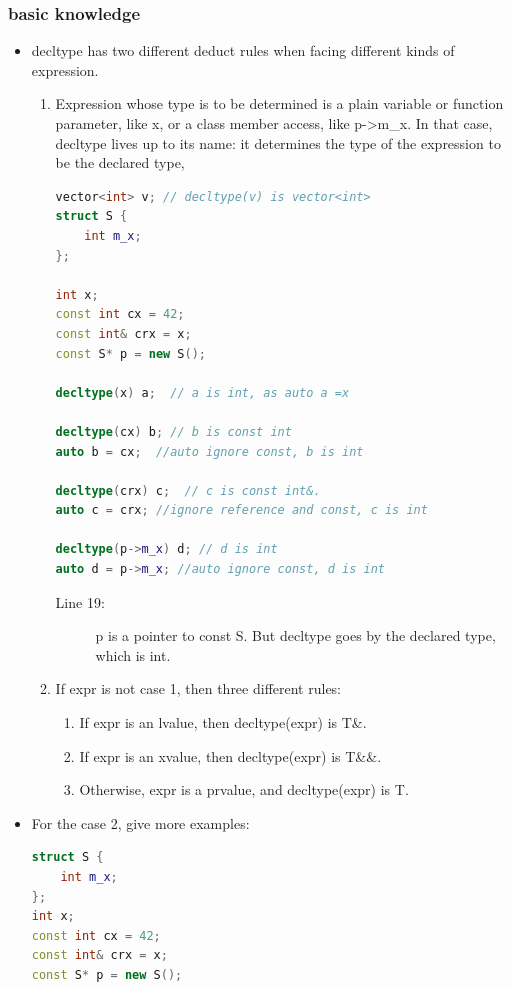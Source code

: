 \documentclass[a4paper,11pt,twoside]{book}
\begin{document}
\subsubsection{basic knowledge}
\begin{itemize}
	\item decltype has two different deduct rules when facing different kinds of expression.
	
	\begin{enumerate}
		\item Expression whose type is to be determined is a plain variable or function parameter, like x, or a class member access, like p->m\_x. In that case, decltype lives up to its name: it determines the type of the expression to be the declared type,
\begin{lstlisting}[frame=single, language=c++]
vector<int> v; // decltype(v) is vector<int>
struct S {
	int m_x;
};

int x;
const int cx = 42;
const int& crx = x;
const S* p = new S();

decltype(x) a;  // a is int, as auto a =x

decltype(cx) b; // b is const int
auto b = cx;  //auto ignore const, b is int

decltype(crx) c;  // c is const int&.
auto c = crx; //ignore reference and const, c is int

decltype(p->m_x) d; // d is int
auto d = p->m_x; //auto ignore const, d is int
\end{lstlisting}
\begin{description}
	\item[Line 19:] p is a pointer to const S. But decltype goes by the declared type, which is int.
\end{description}
		
		\item If expr is not case 1, then three different rules:
		\begin{enumerate}
			\item If expr is an lvalue, then decltype(expr) is T\&. 
			\item If expr is an xvalue, then decltype(expr) is T\&\&. 
			\item Otherwise, expr is a prvalue, and decltype(expr) is T.
		\end{enumerate}
	\end{enumerate}

	\item For the case 2, give more examples:
\begin{lstlisting}[frame=single, language=c++]
struct S {
	int m_x;
};
int x;
const int cx = 42;
const int& crx = x;
const S* p = new S();


\end{lstlisting}
\end{itemize}
\end{document}

